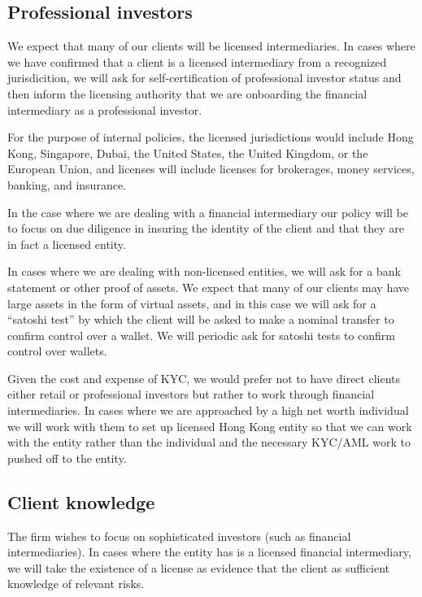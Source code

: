 \subsection{Professional investors}
We expect that many of our clients will be licensed intermediaries.
In cases where we have confirmed that a client is a licensed
intermediary from a recognized jurisdicition, we will ask for
self-certification of professional investor status and then inform the
licensing authority that we are onboarding the financial intermediary
as a professional investor.

For the purpose of internal policies, the licensed jurisdictions would
include Hong Kong, Singapore, Dubai, the United States, the United
Kingdom, or the European Union, and licenses will include licenses for
brokerages, money services, banking, and insurance.

In the case where we are dealing with a financial intermediary our
policy will be to focus on due diligence in insuring the identity of
the client and that they are in fact a licensed entity.

In cases where we are dealing with non-licensed entities, we will ask
for a bank statement or other proof of assets.  We expect that many of
our clients may have large assets in the form of virtual assets, and
in this case we will ask for a ``satoshi test'' by which the client
will be asked to make a nominal transfer to confirm control over a
wallet.  We will periodic ask for satoshi tests to confirm control
over wallets.

Given the cost and expense of KYC, we would prefer not to have direct
clients either retail or professional investors but rather to work
through financial intermediaries.  In cases where we are approached by
a high net worth individual we will work with them to set up licensed
Hong Kong entity so that we can work with the entity rather than the
individual and the necessary KYC/AML work to pushed off to the entity.

\subsection{Client knowledge}

The firm wishes to focus on sophisticated investors (such as financial
intermediaries).  In cases where the entity has is a licensed
financial intermediary, we will take the existence of a license as
evidence that the client as sufficient knowledge of relevant risks.

